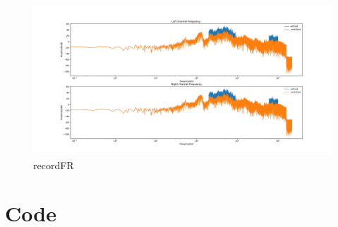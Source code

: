 \documentclass[a4paper,12pt]{article}
\begin{document}
\begin{figure}[h]   
	\centering 
	\includegraphics[width=12cm]{../Output/Figures/recordFR.pdf} 
	\caption{recordFR}   
	\label{fig_recordFR}
\end{figure}

\clearpage
\section{Code}

\end{document}
